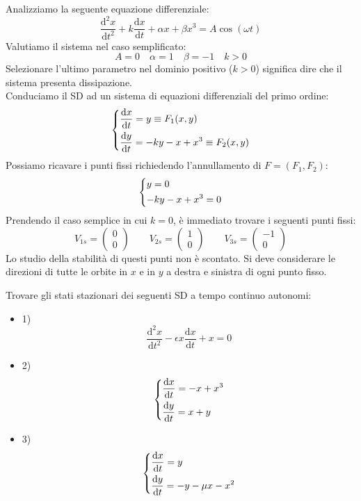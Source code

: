 \begin{exmp}
    Analizziamo la seguente equazione differenziale:
    \[
	\frac{\text{d} ^2x}{\text{d} t^2} + k \frac{\text{d} x}{\text{d} t} + \alpha x + \beta x^3=A\cos (\omega t)
    \] 
    Valutiamo il sistema nel caso semplificato:
    \[
        A = 0 \quad \alpha  = 1 \quad \beta  = -1 \quad k > 0
    \] 
    Selezionare l'ultimo parametro nel dominio positivo ($k>0$) significa dire che il sistema presenta dissipazione.\\
    Conduciamo il SD ad un sistema di equazioni differenziali del primo ordine:
    \[\begin{dcases}
	\frac{\text{d} x}{\text{d} t} = y \equiv F_1(x, y)\\
	\frac{\text{d} y}{\text{d} t} = -ky - x + x^3 \equiv F_2(x, y)
    \end{dcases}\] 
    Possiamo ricavare i punti fissi richiedendo l'annullamento di $F = (F_1, F_2)$:
    \[\begin{dcases}
        y = 0\\
	-ky - x + x^3 = 0
    \end{dcases}\] 
    Prendendo il caso semplice in cui $k = 0$, è immediato trovare i seguenti punti fissi:
    \[
        V_{1s} = \begin{pmatrix} 0 \\ 0 \end{pmatrix} \qquad
        V_{2s} = \begin{pmatrix} 1 \\ 0 \end{pmatrix} \qquad
        V_{3s} = \begin{pmatrix} -1 \\ 0 \end{pmatrix}
    \] 
    Lo studio della stabilità di questi punti non è scontato. Si deve considerare le direzioni di tutte le orbite in $x$ e in $y$ a destra e sinistra di ogni punto fisso.
\end{exmp}
\noindent
\begin{ex}
    Trovare gli stati stazionari dei seguenti SD a tempo continuo autonomi:
    \begin{itemize}
    \item 1) \[
            \frac{\text{d} ^2x}{\text{d} t^2} - \epsilon x\frac{\text{d} x}{\text{d} t}  + x = 0
        \] 
    \item  2)
	\[\begin{dcases}
        \frac{\text{d} x}{\text{d} t} = - x + x^3\\
	\frac{\text{d} y}{\text{d} t} = x + y
        \end{dcases}\] 
    \item 3)
        \[\begin{dcases}
        \frac{\text{d} x}{\text{d} t} = y \\
	\frac{\text{d} y}{\text{d} t} =- y - \mu x - x^2
        \end{dcases}\] 
    \end{itemize}
\end{ex}
\noindent
